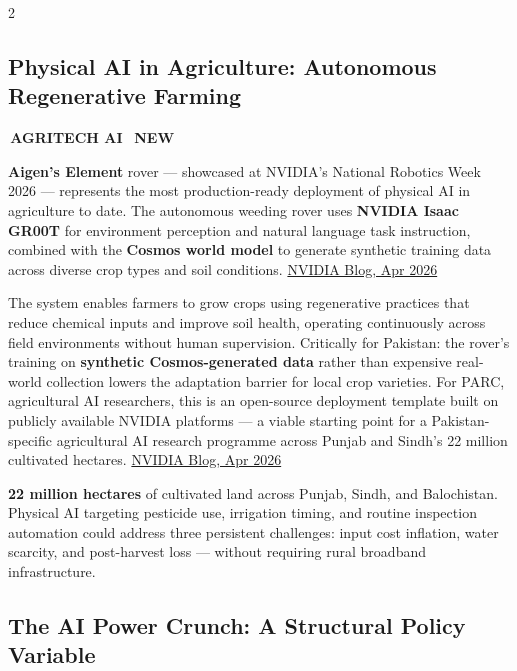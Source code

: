 \documentclass[10pt, a4paper]{article}
\newcommand{\sectiontag}[1]{%
  \noindent\colorbox{cobalt}{%
    \,\footnotesize\bfseries\color{white}\MakeUppercase{#1}\,}\,%
}
\newcommand{\newtag}{%
  \colorbox{emerald}{\,\scriptsize\bfseries\color{white}NEW\,}\ %
}
\begin{document}
\begin{multicols}{2}

\subsection{Physical AI in Agriculture: Autonomous Regenerative Farming}

\sectiontag{AgriTech AI}\quad\newtag

\medskip
{\small
\textbf{Aigen's Element} rover --- showcased at NVIDIA's National Robotics Week 2026 --- represents the most production-ready deployment of physical AI in agriculture to date. The autonomous weeding rover uses \textbf{NVIDIA Isaac GR00T} for environment perception and natural language task instruction, combined with the \textbf{Cosmos world model} to generate synthetic training data across diverse crop types and soil conditions.
\href{https://blogs.nvidia.com/blog/national-robotics-week-2026/}{NVIDIA Blog, Apr 2026}

The system enables farmers to grow crops using regenerative practices that reduce chemical inputs and improve soil health, operating continuously across field environments without human supervision. Critically for Pakistan: the rover's training on \textbf{synthetic Cosmos-generated data} rather than expensive real-world collection lowers the adaptation barrier for local crop varieties. For PARC, agricultural AI researchers, this is an open-source deployment template built on publicly available NVIDIA platforms --- a viable starting point for a Pakistan-specific agricultural AI research programme across Punjab and Sindh's 22 million cultivated hectares.
\href{https://blogs.nvidia.com/blog/national-robotics-week-2026/}{NVIDIA Blog, Apr 2026}
}

\begin{databox}[title={\faSeedling\quad Pakistan Agricultural AI Opportunity}]
  {\small
  \textbf{22 million hectares} of cultivated land across Punjab, Sindh, and Balochistan. Physical AI targeting pesticide use, irrigation timing, and routine inspection automation could address three persistent challenges: input cost inflation, water scarcity, and post-harvest loss --- without requiring rural broadband infrastructure.}
\end{databox}


\subsection{The AI Power Crunch: A Structural Policy Variable}


\end{multicols}
\end{document}
